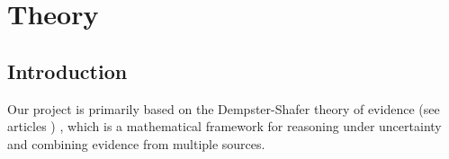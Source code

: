 \chapter{Theory}

\section{Introduction}

Our project is primarily based on the Dempster-Shafer theory of evidence
(see articles \cite{2.5D_Evidential_Grids_for_Dynamic_Object_Detection} \cite{Cloud_Update_of_Tiled_Evidential_Occupancy_Grid_Maps_for_the_Multi_Vehicle_Mapping})
, which is a mathematical framework for reasoning under uncertainty and combining evidence from multiple sources.







